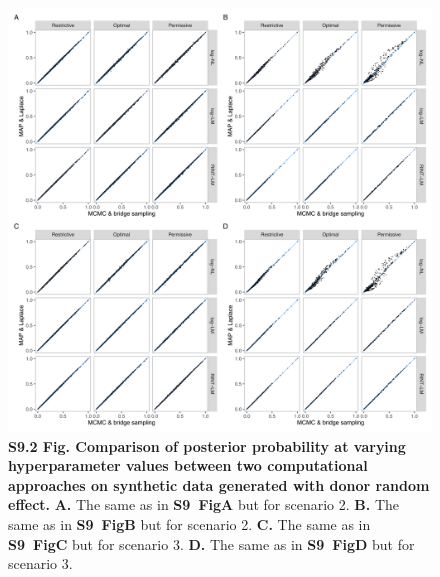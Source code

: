 \documentclass[11pt]{article}
\newcommand{\sfigcompnoranef}{\textbf{S9~Fig}\xspace}
\begin{document}
\begin{figure}[!ht]
\begin{center}
  \includegraphics[width=1\textwidth]{png/sim_compare_pp_ranef.png}
\end{center}  
\caption{
  {\bf
    S9.2 Fig.
    Comparison of posterior probability at varying hyperparameter values between two computational approaches on synthetic data generated with donor random effect.}
\textbf{A.} The same as in \sfigcompnoranef \textbf{A} but for scenario 2.
\textbf{B.} The same as in \sfigcompnoranef \textbf{B} but for scenario 2.
\textbf{C.} The same as in \sfigcompnoranef \textbf{C} but for scenario 3.
\textbf{D.} The same as in \sfigcompnoranef \textbf{D} but for scenario 3.
}
\label{s-fig:sim-compare-pp-ranef}
\end{figure}
\end{document}
